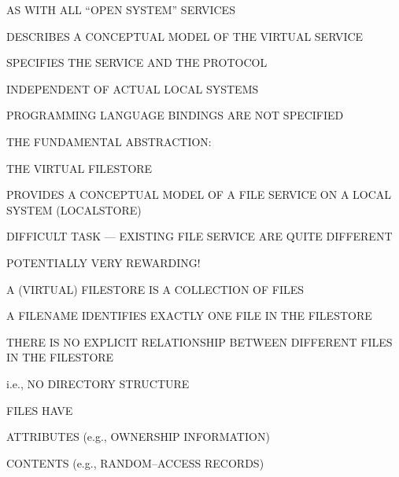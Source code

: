 \begin{bwslide}

\begin{nrtc}
\item	AS WITH ALL ``OPEN SYSTEM'' SERVICES
	\begin{nrtc}
	\item	DESCRIBES A CONCEPTUAL MODEL OF THE VIRTUAL SERVICE
	\item	SPECIFIES THE SERVICE AND THE PROTOCOL
	\item	INDEPENDENT OF ACTUAL LOCAL SYSTEMS
		\begin{nrtc}
		\item	PROGRAMMING LANGUAGE BINDINGS ARE NOT SPECIFIED
		\end{nrtc}
	\end{nrtc}
\item	THE FUNDAMENTAL ABSTRACTION:
	\begin{nrtc}
	\item	THE VIRTUAL FILESTORE
	\end{nrtc}
\item	PROVIDES A CONCEPTUAL MODEL OF A FILE SERVICE ON A LOCAL SYSTEM (LOCALSTORE)
\item	DIFFICULT TASK --- EXISTING FILE SERVICE ARE QUITE DIFFERENT
\item	POTENTIALLY VERY REWARDING!
\end{nrtc}
\end{bwslide}


%


\begin{bwslide}

\begin{nrtc}
\item	A (VIRTUAL) FILESTORE IS A COLLECTION OF FILES
\item	A FILENAME IDENTIFIES EXACTLY ONE FILE IN THE FILESTORE
\item	THERE IS NO EXPLICIT RELATIONSHIP BETWEEN DIFFERENT FILES IN THE FILESTORE
	\begin{nrtc}
	\item	i.e., NO DIRECTORY STRUCTURE
	\end{nrtc}
\item	FILES HAVE
	\begin{nrtc}
	\item	ATTRIBUTES (e.g., OWNERSHIP INFORMATION)
	\item	CONTENTS (e.g., RANDOM--ACCESS RECORDS)
	\end{nrtc}
\end{nrtc}
\end{bwslide}


